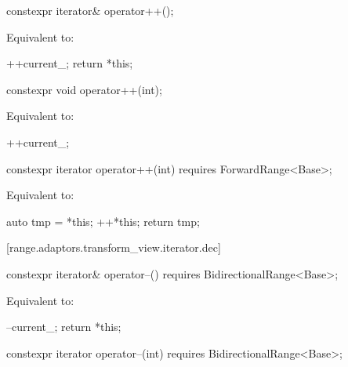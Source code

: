 {
\begin{itemdecl}
constexpr iterator& operator++();
\end{itemdecl}

\begin{itemdescr}
\pnum
\effects Equivalent to:
\begin{codeblock}
++current_;
return *this;
\end{codeblock}
\end{itemdescr}

\begin{itemdecl}
constexpr void operator++(int);
\end{itemdecl}

\begin{itemdescr}
\pnum
\effects Equivalent to:
\begin{codeblock}
++current_;
\end{codeblock}
\end{itemdescr}

\begin{itemdecl}
constexpr iterator operator++(int) requires ForwardRange<Base>;
\end{itemdecl}

\begin{itemdescr}
\pnum
\effects Equivalent to:
\begin{codeblock}
auto tmp = *this;
++*this;
return tmp;
\end{codeblock}
\end{itemdescr}

[range.adaptors.transform_view.iterator.dec]{}

\begin{itemdecl}
constexpr iterator& operator--() requires BidirectionalRange<Base>;
\end{itemdecl}

\begin{itemdescr}
\pnum
\effects Equivalent to:
\begin{codeblock}
--current_;
return *this;
\end{codeblock}
\end{itemdescr}

\begin{itemdecl}
constexpr iterator operator--(int) requires BidirectionalRange<Base>;
\end{itemdecl}

}
